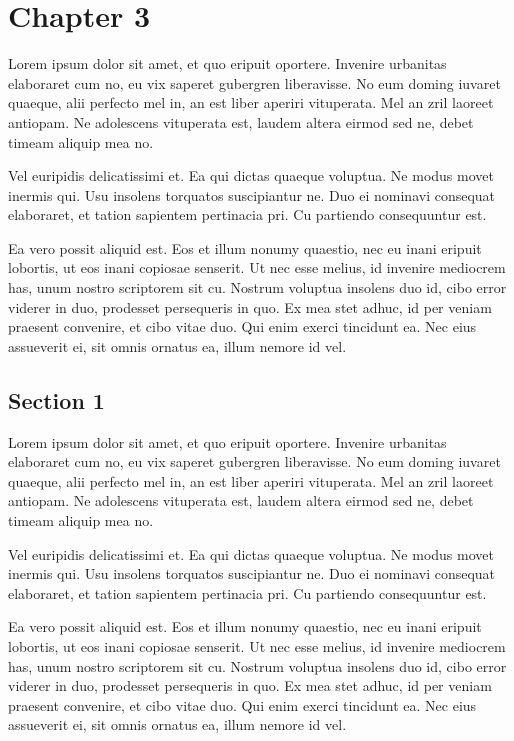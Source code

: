 \chapter{Chapter 3}
\label{chapter:maintext2}

Lorem ipsum dolor sit amet, et quo eripuit oportere. Invenire urbanitas elaboraret cum no, eu vix saperet gubergren liberavisse. No eum doming iuvaret quaeque, alii perfecto mel in, an est liber aperiri vituperata. Mel an zril laoreet antiopam. Ne adolescens vituperata est, laudem altera eirmod sed ne, debet timeam aliquip mea no.

Vel euripidis delicatissimi et. Ea qui dictas quaeque voluptua. Ne modus movet inermis qui. Usu insolens torquatos suscipiantur ne. Duo ei nominavi consequat elaboraret, et tation sapientem pertinacia pri. Cu partiendo consequuntur est.

Ea vero possit aliquid est. Eos et illum nonumy quaestio, nec eu inani eripuit lobortis, ut eos inani copiosae senserit. Ut nec esse melius, id invenire mediocrem has, unum nostro scriptorem sit cu. Nostrum voluptua insolens duo id, cibo error viderer in duo, prodesset persequeris in quo. Ex mea stet adhuc, id per veniam praesent convenire, et cibo vitae duo. Qui enim exerci tincidunt ea. Nec eius assueverit ei, sit omnis ornatus ea, illum nemore id vel.

\section{Section 1}\label{section1}

Lorem ipsum dolor sit amet, et quo eripuit oportere. Invenire urbanitas elaboraret cum no, eu vix saperet gubergren liberavisse. No eum doming iuvaret quaeque, alii perfecto mel in, an est liber aperiri vituperata. Mel an zril laoreet antiopam. Ne adolescens vituperata est, laudem altera eirmod sed ne, debet timeam aliquip mea no.

Vel euripidis delicatissimi et. Ea qui dictas quaeque voluptua. Ne modus movet inermis qui. Usu insolens torquatos suscipiantur ne. Duo ei nominavi consequat elaboraret, et tation sapientem pertinacia pri. Cu partiendo consequuntur est.

Ea vero possit aliquid est. Eos et illum nonumy quaestio, nec eu inani eripuit lobortis, ut eos inani copiosae senserit. Ut nec esse melius, id invenire mediocrem has, unum nostro scriptorem sit cu. Nostrum voluptua insolens duo id, cibo error viderer in duo, prodesset persequeris in quo. Ex mea stet adhuc, id per veniam praesent convenire, et cibo vitae duo. Qui enim exerci tincidunt ea. Nec eius assueverit ei, sit omnis ornatus ea, illum nemore id vel.

